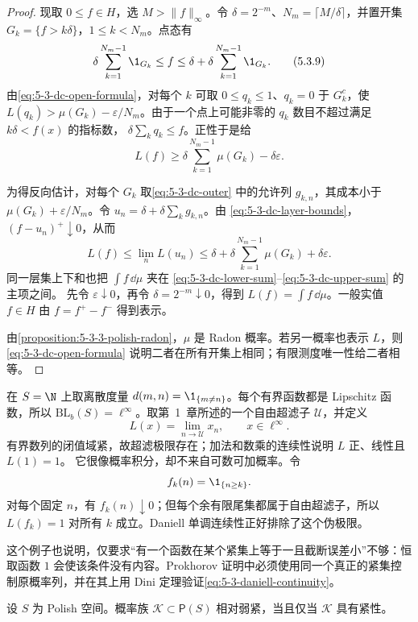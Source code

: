 \begin{proof}
现取 $0\le f\in H$，选 $M>\|f\|_\infty$。令
$\delta=2^{-m}$、$N_m=\lceil M/\delta\rceil$，并置开集
$G_k=\{f>k\delta\}$，$1\le k<N_m$。点态有
\[
 \delta\sum_{k=1}^{N_m-1}\1_{G_k}
 \le f
 \le\delta+\delta\sum_{k=1}^{N_m-1}\1_{G_k}.
 \tag{5.3.9}\label{eq:5-3-dc-layer-bounds}
\]
由\eqref{eq:5-3-dc-open-formula}，对每个 $k$ 可取
$0\le q_k\le1$、$q_k=0$ 于 $G_k^c$，使
$L(q_k)>\mu(G_k)-\varepsilon/N_m$。由于一个点上可能非零的 $q_k$
数目不超过满足 $k\delta<f(x)$ 的指标数，
$\delta\sum_kq_k\le f$。正性于是给
\[
 L(f)\ge
 \delta\sum_{k=1}^{N_m-1}\mu(G_k)-\delta\varepsilon.
 \tag{5.3.10}\label{eq:5-3-dc-lower-sum}
\]

为得反向估计，对每个 $G_k$ 取\eqref{eq:5-3-dc-outer} 中的允许列
$g_{k,n}$，其成本小于 $\mu(G_k)+\varepsilon/N_m$。令
$u_n=\delta+\delta\sum_kg_{k,n}$。由
\eqref{eq:5-3-dc-layer-bounds}，$(f-u_n)^+\downarrow0$，从而
\[
 L(f)\le\lim_nL(u_n)
 \le\delta+\delta\sum_{k=1}^{N_m-1}\mu(G_k)+\delta\varepsilon.
 \tag{5.3.11}\label{eq:5-3-dc-upper-sum}
\]
同一层集上下和也把 $\int f\,\dd\mu$ 夹在
\eqref{eq:5-3-dc-lower-sum}--\eqref{eq:5-3-dc-upper-sum} 的主项之间。
先令 $\varepsilon\downarrow0$，再令 $\delta=2^{-m}\downarrow0$，得到
$L(f)=\int f\,\dd\mu$。一般实值 $f\in H$ 由
$f=f^+-f^-$ 得到表示。

由\cref{proposition:5-3-3-polish-radon}，$\mu$ 是 Radon 概率。若另一概率也表示
$L$，则\eqref{eq:5-3-dc-open-formula} 说明二者在所有开集上相同；有限测度唯一性给二者相等。
\end{proof}

\begin{example}[单调连续性排除的伪极限]\label{ex:5-3-3-ultrafilter-limit}
在 $S=\N$ 上取离散度量 $d(m,n)=\1_{\{m\ne n\}}$。每个有界函数都是 Lipschitz 函数，所以
$\mathrm{BL}_b(S)=\ell^\infty$。取第~1~章所述的一个自由超滤子 $\mathcal U$，并定义
\[
 L(x)=\lim_{n\to\mathcal U}x_n,\qquad x\in\ell^\infty.
\]
有界数列的闭值域紧，故超滤极限存在；加法和数乘的连续性说明 $L$ 正、线性且 $L(1)=1$。
它很像概率积分，却不来自可数可加概率。令
\[
 f_k(n)=\1_{\{n\ge k\}}.
\]
对每个固定 $n$，有 $f_k(n)\downarrow0$；但每个余有限尾集都属于自由超滤子，所以
$L(f_k)=1$ 对所有 $k$ 成立。Daniell 单调连续性正好排除了这个伪极限。

这个例子也说明，仅要求“有一个函数在某个紧集上等于一且截断误差小”不够：恒取函数
$1$ 会使该条件没有内容。Prokhorov 证明中必须使用同一个真正的紧集控制原概率列，并在其上用
Dini 定理验证\eqref{eq:5-3-daniell-continuity}。
\end{example}

\begin{theorem}[Prokhorov 定理]\label{theorem:5-3-3-2}
设 $S$ 为 Polish 空间。概率族 $\mathcal K\subset\mathsf P(S)$ 相对弱紧，当且仅当
$\mathcal K$ 具有紧性。
\end{theorem}

